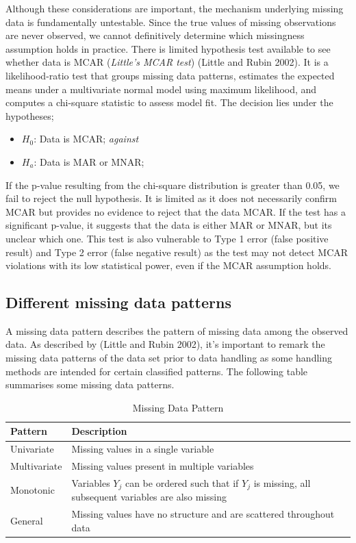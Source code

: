 \documentclass{article}
\providecommand{\tightlist}{%
  \setlength{\itemsep}{0pt}\setlength{\parskip}{0pt}}
\begin{document}
Although these considerations are important, the mechanism underlying
missing data is fundamentally untestable. Since the true values of
missing observations are never observed, we cannot definitively
determine which missingness assumption holds in practice. There is
limited hypothesis test available to see whether data is MCAR
(\emph{Little's MCAR test}) (Little and Rubin 2002). It is a
likelihood-ratio test that groups missing data patterns, estimates the
expected means under a multivariate normal model using maximum
likelihood, and computes a chi-square statistic to assess model fit. The
decision lies under the hypotheses;

\begin{itemize}
\tightlist
\item
  \(H_0\): Data is MCAR; \emph{against}
\item
  \(H_a\): Data is MAR or MNAR;
\end{itemize}

If the p-value resulting from the chi-square distribution is greater
than 0.05, we fail to reject the null hypothesis. It is limited as it
does not necessarily confirm MCAR but provides no evidence to reject
that the data MCAR. If the test has a significant p-value, it suggests
that the data is either MAR or MNAR, but its unclear which one. This
test is also vulnerable to Type 1 error (false positive result) and Type
2 error (false negative result) as the test may not detect MCAR
violations with its low statistical power, even if the MCAR assumption
holds.

\subsection{Different missing data
patterns}\label{different-missing-data-patterns}

A missing data pattern describes the pattern of missing data among the
observed data. As described by (Little and Rubin 2002), it's important
to remark the missing data patterns of the data set prior to data
handling as some handling methods are intended for certain classified
patterns. The following table summarises some missing data patterns.

\begin{table}[H]
\centering
\caption{Missing Data Pattern}
\label{}

\begin{tabular}{ll}
\toprule
Pattern & Description\\
\midrule
Univariate & Missing values in a single variable\\
Multivariate & Missing values present in multiple variables\\
Monotonic & Variables $Y_j$ can be ordered such that if $Y_j$ is missing, all subsequent variables are also missing\\
General & Missing values have no structure and are scattered throughout data\\
\bottomrule
\end{tabular}
\end{table}
\end{document}
